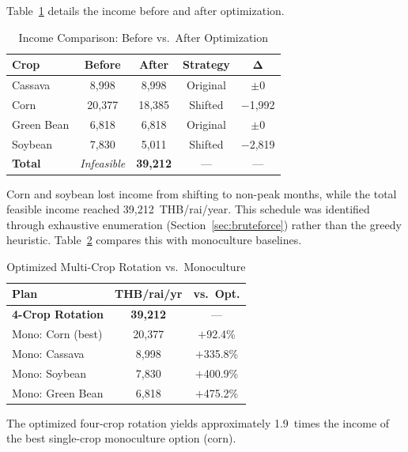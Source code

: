 \documentclass[journal]{IEEEtran}
\begin{document}
Table~\ref{tab:income_detail} details the income before and after optimization.

\begin{table}[htbp]
  \centering
  \caption{Income Comparison: Before vs.\ After Optimization}
  \label{tab:income_detail}
  \begin{tabular}{lcccc}
    \toprule
    \textbf{Crop} & \textbf{Before} & \textbf{After} & \textbf{Strategy} & $\boldsymbol{\Delta}$ \\
    \midrule
    Cassava    & 8,998  & 8,998  & Original & $\pm$0     \\
    Corn       & 20,377 & 18,385 & Shifted  & $-$1,992  \\
    Green Bean & 6,818  & 6,818  & Original & $\pm$0     \\
    Soybean    & 7,830  & 5,011  & Shifted  & $-$2,819  \\
    \midrule
    \textbf{Total} & \textit{Infeasible} & \textbf{39,212} & --- & --- \\
    \bottomrule
  \end{tabular}
\end{table}

Corn and soybean lost income from shifting to non-peak months, while the total feasible income reached 39,212~THB/rai/year. This schedule was identified through exhaustive enumeration (Section~\ref{sec:bruteforce}) rather than the greedy heuristic. Table~\ref{tab:mono} compares this with monoculture baselines.

\begin{table}[htbp]
  \centering
  \caption{Optimized Multi-Crop Rotation vs.\ Monoculture}
  \label{tab:mono}
  \begin{tabular}{lcc}
    \toprule
    \textbf{Plan} & \textbf{THB/rai/yr} & \textbf{vs.\ Opt.} \\
    \midrule
    \textbf{4-Crop Rotation} & \textbf{39,212} & --- \\
    Mono: Corn (best) & 20,377 & $+$92.4\% \\
    Mono: Cassava & 8,998 & $+$335.8\% \\
    Mono: Soybean & 7,830 & $+$400.9\% \\
    Mono: Green Bean & 6,818  & $+$475.2\% \\
    \bottomrule
  \end{tabular}
\end{table}

The optimized four-crop rotation yields approximately 1.9~times the income of the best single-crop monoculture option (corn).
\end{document}
